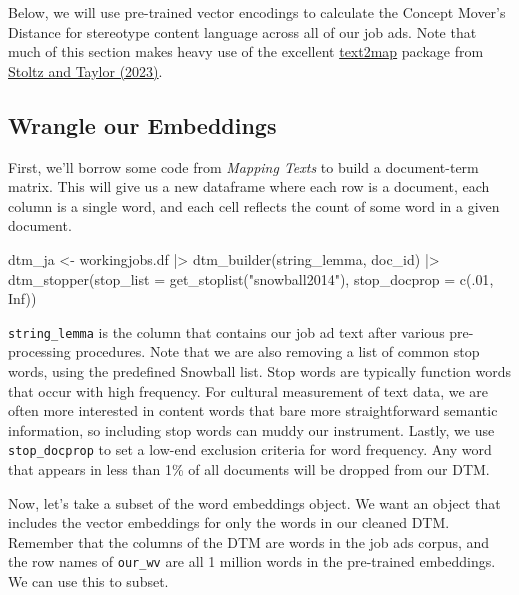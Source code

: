 \documentclass[
  letterpaper,
  DIV=11,
  numbers=noendperiod]{scrreprt}
\newenvironment{Shaded}{\begin{snugshade}}{\end{snugshade}}
\newcommand{\AttributeTok}[1]{\textcolor[rgb]{0.40,0.45,0.13}{#1}}
\newcommand{\ConstantTok}[1]{\textcolor[rgb]{0.56,0.35,0.01}{#1}}
\newcommand{\DecValTok}[1]{\textcolor[rgb]{0.68,0.00,0.00}{#1}}
\newcommand{\FunctionTok}[1]{\textcolor[rgb]{0.28,0.35,0.67}{#1}}
\newcommand{\NormalTok}[1]{\textcolor[rgb]{0.00,0.23,0.31}{#1}}
\newcommand{\OtherTok}[1]{\textcolor[rgb]{0.00,0.23,0.31}{#1}}
\newcommand{\SpecialCharTok}[1]{\textcolor[rgb]{0.37,0.37,0.37}{#1}}
\newcommand{\StringTok}[1]{\textcolor[rgb]{0.13,0.47,0.30}{#1}}
\begin{document}
Below, we will use pre-trained vector encodings to calculate the Concept
Mover's Distance for stereotype content language across all of our job
ads. Note that much of this section makes heavy use of the excellent
\href{https://culturalcartography.gitlab.io/text2map/}{text2map} package
from
\href{https://global.oup.com/academic/product/mapping-texts-9780197756881?cc=us&lang=en&}{Stoltz
and Taylor (2023)}.

\subsection{Wrangle our Embeddings}\label{wrangle-our-embeddings}

First, we'll borrow some code from \emph{Mapping Texts} to build a
document-term matrix. This will give us a new dataframe where each row
is a document, each column is a single word, and each cell reflects the
count of some word in a given document.

\begin{Shaded}
\begin{Highlighting}[]
\NormalTok{dtm\_ja }\OtherTok{\textless{}{-}}\NormalTok{ workingjobs.df }\SpecialCharTok{|\textgreater{}}
  \FunctionTok{dtm\_builder}\NormalTok{(string\_lemma, doc\_id) }\SpecialCharTok{|\textgreater{}}
  \FunctionTok{dtm\_stopper}\NormalTok{(}\AttributeTok{stop\_list =} \FunctionTok{get\_stoplist}\NormalTok{(}\StringTok{"snowball2014"}\NormalTok{),}
              \AttributeTok{stop\_docprop =} \FunctionTok{c}\NormalTok{(.}\DecValTok{01}\NormalTok{, }\ConstantTok{Inf}\NormalTok{))}
\end{Highlighting}
\end{Shaded}

\texttt{string\_lemma} is the column that contains our job ad text after
various pre-processing procedures. Note that we are also removing a list
of common stop words, using the predefined Snowball list. Stop words are
typically function words that occur with high frequency. For cultural
measurement of text data, we are often more interested in content words
that bare more straightforward semantic information, so including stop
words can muddy our instrument. Lastly, we use \texttt{stop\_docprop} to
set a low-end exclusion criteria for word frequency. Any word that
appears in less than 1\% of all documents will be dropped from our DTM.

Now, let's take a subset of the word embeddings object. We want an
object that includes the vector embeddings for only the words in our
cleaned DTM. Remember that the columns of the DTM are words in the job
ads corpus, and the row names of \texttt{our\_wv} are all 1 million
words in the pre-trained embeddings. We can use this to subset.
\end{document}
